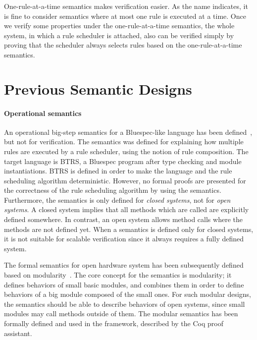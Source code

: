 One-rule-at-a-time semantics makes verification easier. As the name
indicates, it is fine to consider semantics where at most one rule is
executed at a time. Once we verify some properties under the
one-rule-at-a-time semantics, the whole system, in which a rule
scheduler is attached, also can be verified simply by proving that the
scheduler always selects rules based on the one-rule-at-a-time
semantics.

\section{Previous Semantic Designs}
\label{sec:related-works}

\paragraph{Operational semantics}

An operational big-step semantics for a Bluespec-like language has
been defined~\cite{nirav-memocode}, but not for verification. The
semantics was defined for explaining how multiple rules are executed
by a rule scheduler, using the notion of rule composition. The target
language is BTRS, a Bluespec program after type checking and module
instantiations. BTRS is defined in order to make the language and the
rule scheduling algorithm deterministic. However, no formal proofs are
presented for the correctness of the rule scheduling algorithm by
using the semantics. Furthermore, the semantics is only defined for
\emph{closed systems}, not for \emph{open systems}. A closed system
implies that all methods which are called are explicitly defined
somewhere. In contrast, an open system allows method calls where the
methods are not defined yet. When a semantics is defined only for
closed systems, it is not suitable for scalable verification since it
always requires a fully defined system.

The formal semantics for open hardware system has been subsequently
defined based on modularity~\cite{murali-thesis}. The core concept for
the semantics is modularity; it defines behaviors of small basic
modules, and combines them in order to define behaviors of a big
module composed of the small ones. For such modular designs, the
semantics should be able to describe behaviors of open systems, since
small modules may call methods outside of them. The modular semantics
has been formally defined and used in the \Kami{} framework, described
by the Coq proof assistant.

